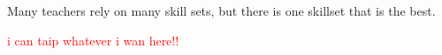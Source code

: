 \documentclass{grattan}
\newcommand*{\hl}[1]{\textcolor{red}{#1}}
\begin{document}
Many teachers rely on many skill sets, but there is one skillset that is the best.

\hl{i can taip whatever i wan here!!}
\end{document}
